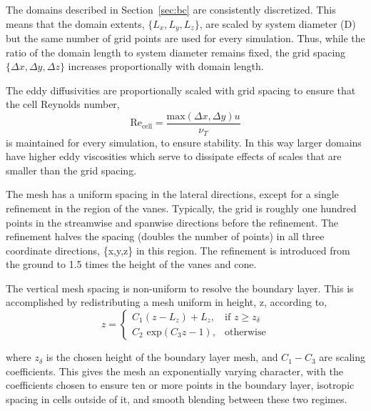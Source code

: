 %
%
The domains described in Section~\ref{sec:bc} are consistently
discretized. This means that the domain extents, $\{L_x,L_y,L_z\}$, are
scaled by system diameter (D) but the same number of grid points are
used for every simulation. Thus, while the ratio of the domain length to
system diameter remains fixed, the grid spacing $\{\Delta x,\Delta
y,\Delta z\}$ increases proportionally with domain length.  

The eddy diffusivities are proportionally scaled with grid spacing to
ensure that the cell Reynolds number, 
\begin{equation}
 \text{Re}_\text{cell} = \frac{\text{max}(\Delta x,\Delta y) u}{\nu_T}
\end{equation} 
is maintained for every simulation, to ensure stability. In this way
 larger domains have higher eddy viscosities which serve to dissipate
 effects of scales that are smaller than the grid spacing. 

The mesh has a uniform spacing in the lateral directions, except for a
single refinement in the region of the vanes. Typically, the grid is 
roughly one hundred points in the streamwise and spanwise directions
before the refinement. The refinement halves the spacing (doubles the
number of points) in all three coordinate directions, \{x,y,z\} in this
region. The refinement is introduced from the ground to 1.5 times the
height of the vanes and cone.

%
%
%
%
%

The vertical mesh spacing is non-uniform to resolve the boundary
layer.
 This is accomplished by redistributing a 
mesh uniform in height, z, according to,
\begin{equation}
 z = \begin{cases} C_1(z-L_z)+L_z,& \text{if } z \geq z_\delta\\
      C_2 \text{ exp}(C_3 z - 1),                 & \text{otherwise}
     \end{cases}
\end{equation}

where $z_\delta$ is the chosen height of the boundary layer mesh, and
$C_1-C_3$ are scaling coefficients. %
This gives the mesh an exponentially
varying character, with the coefficients chosen to ensure ten or more
points in the boundary layer, isotropic spacing in cells outside of
it, and smooth blending between these two regimes. 

